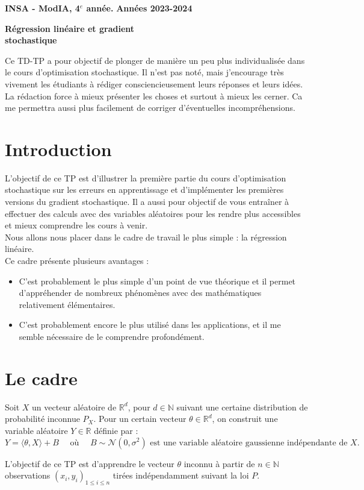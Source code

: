 \documentclass[12pt,a4paper]{article}
\newcommand{\entete}{
    \noindent\textbf{INSA - ModIA, 4$^e$ année.}
    \hfill \textbf{Années 2023-2024}
    
    \begin{center}
        \textbf{\LARGE Régression linéaire et gradient \\
        stochastique}
    \end{center}
}
\begin{document}
\entete

Ce TD-TP a pour objectif de plonger de manière un peu plus individualisée dans le cours d’optimisation stochastique.
Il n’est pas noté, mais j’encourage très vivement les étudiants à rédiger consciencieusement leurs réponses et leurs idées.
La rédaction force à mieux présenter les choses et surtout à mieux les cerner.
Ca me permettra aussi plus facilement de corriger d’éventuelles incompréhensions.


\section{Introduction}

L’objectif de ce TP est d’illustrer la première partie du cours d’optimisation stochastique sur les erreurs en apprentissage et d’implémenter les premières versions du gradient stochastique.
Il a aussi pour objectif de vous entraîner à effectuer des calculs avec des variables aléatoires pour les rendre plus accessibles et mieux comprendre les cours à venir.\\
Nous allons nous placer dans le cadre de travail le plus simple : la régression linéaire. \\
Ce cadre présente plusieurs avantages :

\begin{itemize}[label=---]
    \item C’est probablement le plus simple d’un point de vue théorique 
    et il permet d’appréhender de nombreux phénomènes avec des mathématiques relativement élémentaires.
    \item C’est probablement encore le plus utilisé dans les applications, et il me semble nécessaire de le comprendre profondément.
\end{itemize}



\section{Le cadre}
Soit $X$ un vecteur aléatoire de $\mathbb{R}^d$, pour $d \in \mathbb{N}$ suivant une certaine distribution de probabilité inconnue $P_X$. Pour un certain vecteur $\theta \in \mathbb{R}^d$, on construit une variable aléatoire $Y \in \mathbb{R}$ définie par :
$$
Y = \langle \theta, X\rangle + B \quad \text{ où } \quad B \sim \mathcal{N}(0, \sigma^2) \text{ est une variable aléatoire gaussienne indépendante de } X.
$$

L’objectif de ce TP est d’apprendre le vecteur $\theta$ inconnu à partir de $n \in \mathbb{N}$ observations $(x_i, y_i)_{1 \leq i \leq n}$ tirées indépendamment suivant la loi $P$.
\end{document}
